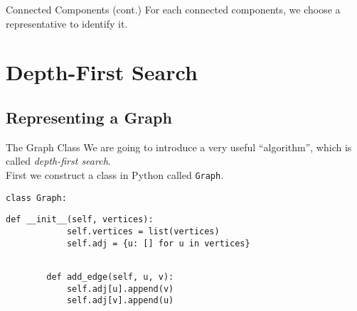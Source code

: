 \documentclass{beamer}
\begin{document}
\begin{frame}{Connected Components (cont.)}
  For each connected components, we choose a representative to identify it.
  \vspace{1.5em}
  \begin{figure}
  \end{figure}
\end{frame}

\section{Depth-First Search}
\subsection{Representing a Graph}
\begin{frame}[fragile]{The Graph Class}
  We are going to introduce a very useful ``algorithm'', which is called
  \emph{depth-first search}. \pause \\[1em]
  First we construct a class in Python called \lstinline{Graph}. \pause
  \begin{block}{}
    \scriptsize
    \begin{lstlisting}[gobble=4]
    class Graph:
    \end{lstlisting}
    \pause
    \begin{lstlisting}[gobble=4]
        def __init__(self, vertices):
            self.vertices = list(vertices)
            self.adj = {u: [] for u in vertices}
    \end{lstlisting}
    \pause
    \begin{lstlisting}[gobble=4]

        def add_edge(self, u, v):
            self.adj[u].append(v)
            self.adj[v].append(u)
    \end{lstlisting}
  \end{block}
\end{frame}
\end{document}
